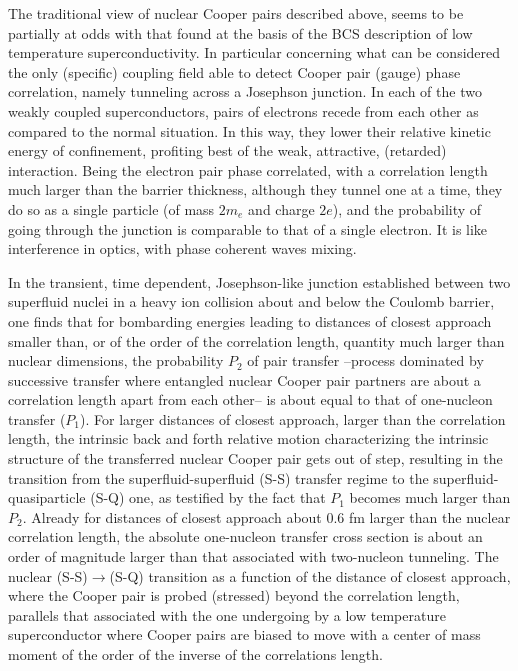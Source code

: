 The traditional view of nuclear Cooper pairs described above, seems to be partially at odds with that found at the basis of the BCS description of low temperature superconductivity. In particular concerning what can be considered the only (specific) coupling field able to detect Cooper pair (gauge) phase correlation, namely tunneling across a Josephson junction. In each of the two weakly coupled superconductors, pairs of electrons recede from each other  as compared to the normal situation. In this way, they lower their relative kinetic energy of confinement, profiting best of the weak, attractive, (retarded) interaction. Being the electron pair phase correlated, with a correlation length much larger than the barrier thickness, although they tunnel one at a time, they do so as a single particle (of mass $2m_e$ and charge $2e$), and the probability of going through the junction is comparable to that of a single electron. It is like interference in optics, with phase coherent waves mixing.

In the transient, time dependent, Josephson-like junction established between two superfluid nuclei     in a heavy ion collision about and below the Coulomb barrier, one finds that for bombarding energies leading to distances of closest approach smaller than, or of the order of the correlation length, quantity much larger than nuclear dimensions, the probability $P_2$ of pair transfer --process dominated by successive transfer where entangled nuclear Cooper pair partners are about a correlation length apart from each other-- is about equal to that of one-nucleon transfer ($P_1$). For larger distances of closest approach, larger than the correlation length, the intrinsic back and forth relative motion  characterizing the intrinsic structure of the transferred nuclear Cooper pair gets out of step, resulting in the transition from the superfluid-superfluid (S-S) transfer regime to the superfluid-quasiparticle (S-Q) one, as testified by the fact that  $P_1$ becomes much larger than $P_2$. Already for distances of closest approach about 0.6 fm larger than the nuclear correlation length, the absolute  one-nucleon transfer cross section is about an order of magnitude larger than that associated with two-nucleon tunneling. The nuclear (S-S)$\to$(S-Q)  transition as a function of the distance of closest approach, where the Cooper pair is probed (stressed) beyond the correlation length, parallels that associated with the one undergoing by a low temperature superconductor where Cooper pairs are biased to move with a center of mass moment of the order of the inverse of the correlations length.

